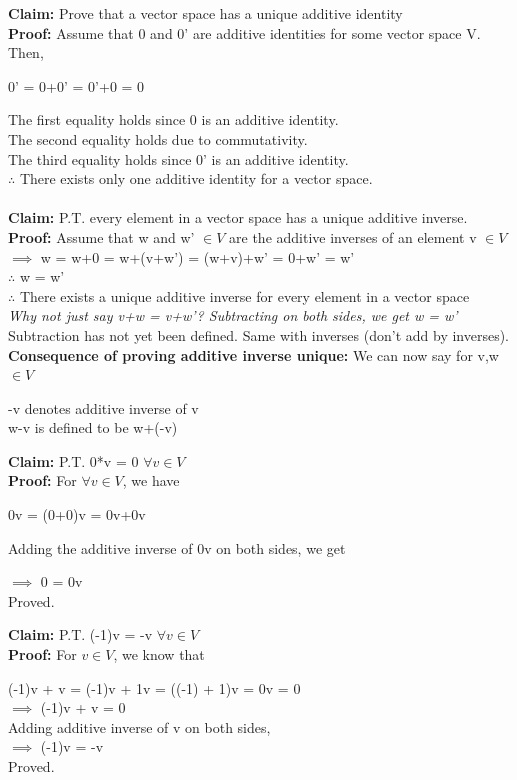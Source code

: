 \documentclass{article}
\begin{document}
\textbf{Claim:} Prove that a vector space has a unique additive identity \\
\textbf{Proof:} Assume that 0 and 0' are additive identities for some vector space V. \\
Then, 
\begin{center}
    0' = 0+0' = 0'+0 = 0
\end{center}
The first equality holds since 0 is an additive identity. \\
The second equality holds due to commutativity. \\
The third equality holds since 0' is an additive identity.\\
$\therefore$ There exists only one additive identity for a vector space. \\
\\
\textbf{Claim:} P.T. every element in a vector space has a unique additive inverse. \\
\textbf{Proof:} Assume that w and w' $\in V$ are the additive inverses of an element v $\in V$ \\
$\implies$ w = w+0 = w+(v+w') = (w+v)+w' = 0+w' = w' \\ 
$\therefore$ w = w' \\
$\therefore$ There exists a unique additive inverse for every element in a vector space \\
\textit{Why not just say v+w = v+w'? Subtracting on both sides, we get w = w'} \\
Subtraction has not yet been defined. Same with inverses (don't add by inverses). \\ 
\textbf{Consequence of proving additive inverse unique:} We can now say for v,w $\in V$ 
\begin{center}
    -v denotes additive inverse of v \\
    w-v is defined to be w+(-v)
\end{center}
\textbf{Claim:} P.T. 0*v = 0 $\forall v \in V$ \\
\textbf{Proof:} For $\forall v \in V$, we have \\
\begin{center}
    0v = (0+0)v = 0v+0v
\end{center}
Adding the additive inverse of 0v on both sides, we get \\
\begin{center}
    $\implies$ 0 = 0v \\
    Proved.
\end{center}
\textbf{Claim:} P.T. (-1)v = -v $\forall v \in V$ \\
\textbf{Proof:} For $v \in V$, we know that 
\begin{center}
    (-1)v + v = (-1)v + 1v = ((-1) + 1)v = 0v = 0 \\
    $\implies$ (-1)v + v = 0 \\ 
    Adding additive inverse of v on both sides, \\ 
    $\implies$ (-1)v = -v \\
    Proved.
\end{center}
\end{document}
